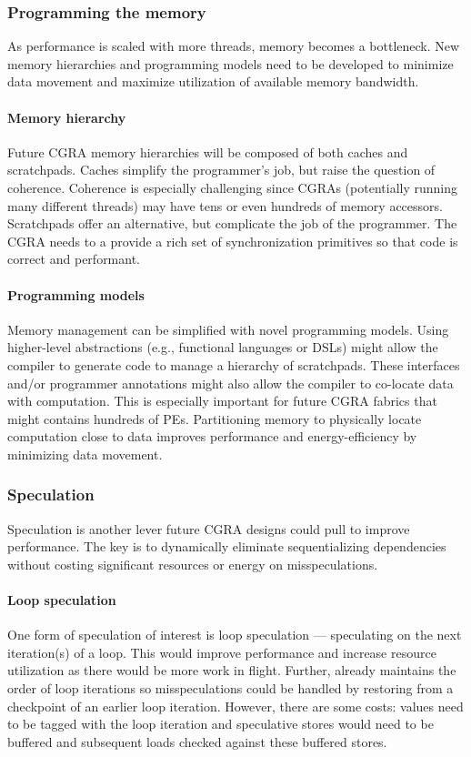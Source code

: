 \subsubsection{Programming the memory}
As performance is scaled with more threads, memory becomes a bottleneck.
% 
New memory hierarchies and programming models need to be developed to minimize data movement and maximize utilization of available memory bandwidth.

\paragraph{Memory hierarchy}
Future CGRA memory hierarchies will be composed of both caches and scratchpads.
% 
Caches simplify the programmer's job, but raise the question of coherence.
% 
Coherence is especially challenging since CGRAs (potentially running many different threads) may have tens or even hundreds of memory accessors.
% 
Scratchpads offer an alternative, but complicate the job of the programmer.
% 
The CGRA needs to a provide a rich set of synchronization primitives so that code is correct and performant.

\paragraph{Programming models}
Memory management can be simplified with novel programming models.
% 
Using higher-level abstractions (e.g., functional languages or DSLs) might allow the compiler to generate code to manage a hierarchy of scratchpads.
%
These interfaces and/or programmer annotations might also allow the compiler to co-locate data with computation.
% 
This is especially important for future CGRA fabrics that might contains hundreds of PEs.
% 
Partitioning memory to physically locate computation close to data improves performance and energy-efficiency by minimizing data movement.

\subsubsection{Speculation}
Speculation is another lever future CGRA designs could pull to improve performance.
%
The key is to dynamically eliminate sequentializing dependencies without costing significant resources or energy on misspeculations.

\paragraph{Loop speculation}
One form of speculation of interest is loop speculation --- speculating on the next iteration(s) of a loop.
% 
This would improve performance and increase resource utilization as there would be more work in flight.
% 
Further, \riptide already maintains the order of loop iterations so misspeculations could be handled by restoring from a checkpoint of an earlier loop iteration.
% 
However, there are some costs: values need to be tagged with the loop iteration and speculative stores would need to be buffered and subsequent loads checked against these buffered stores.

